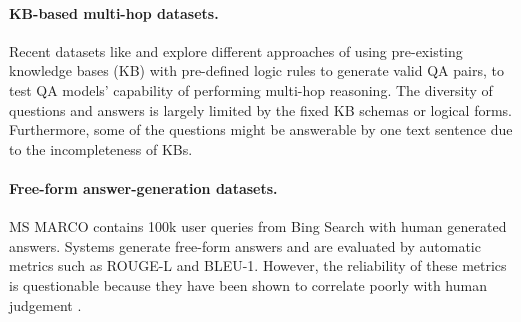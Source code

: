 \paragraph{KB-based multi-hop datasets.}
Recent datasets like
\wikihop{} \cite{welbl2017constructing} and \complexwebq{} \cite{talmor2018web} explore different approaches of using pre-existing knowledge bases (KB) with pre-defined logic rules to generate valid QA pairs, to test QA models' capability of performing multi-hop reasoning.
The diversity of questions and answers is largely limited by the fixed KB schemas or logical forms.
Furthermore, some of the questions might be answerable by one text sentence due to the incompleteness of KBs.

\paragraph{Free-form answer-generation datasets.}
MS MARCO \cite{nguyen2016ms} contains 100k user queries from Bing Search with human generated answers. Systems generate free-form answers and are evaluated by automatic metrics such as ROUGE-L and BLEU-1. However, the reliability of these metrics is questionable because they have been shown to correlate poorly with human judgement \cite{novikova2017we}.

